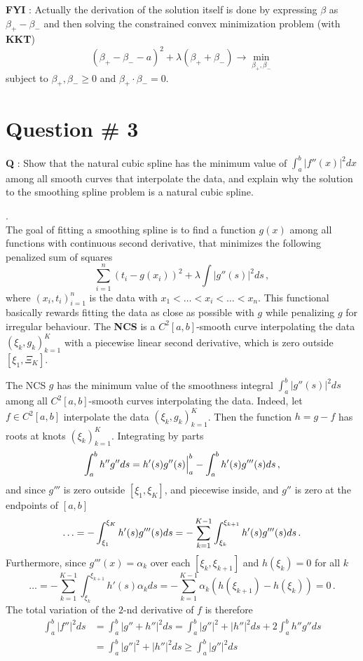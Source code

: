 \documentclass[a4paper]{article}
\begin{document}
\noindent\textbf{FYI} : Actually the derivation of the solution itself is done
by expressing $\beta$ as $\beta_+-\beta_-$ and then solving the constrained convex
minimization problem (with \textbf{KKT})
\[ (\beta_+ - \beta_- - a )^2 + \lambda (\beta_+ + \beta_-) \to \min_{\beta_+,\beta_-}\]
subject to $\beta_+, \beta_-\geq 0$ and $\beta_+ \cdot \beta_-=0$.

\clearpage

\section[NCS]{Question \# 3} %
\label{sec:question_3}
\textbf{\large \textbf{Q}} : Show that the natural cubic spline has the minimum
value of $\int_a^b |f''(x)|^2 dx$ among all smooth curves that interpolate the
data, and explain why the solution to the smoothing spline problem is a natural
cubic spline.

 .\hfill\\
The goal of fitting a smoothing spline is to find a function $g(x)$ among all
functions with continuous second derivative, that minimizes the following penalized
sum of squares
\[ \sum_{i=1}^n (t_i - g(x_i))^2 + \lambda \int |g''(s)|^2 ds \,, \]
where $(x_i,t_i)_{i=1}^n$ is the data with $x_1<\ldots<x_i<\ldots<x_n$.
This functional basically rewards fitting the data as close as possible with $g$
while penalizing $g$ for irregular behaviour. The \textbf{NCS} is a $C^2[a,b]$-smooth
curve interpolating the data $(\xi_k, g_k)_{k=1}^K$ with a piecewise linear second
derivative, which is zero outside $[\xi_1,\Xi_K]$.

The NCS $g$ has the minimum value of the smoothness integral $\int_a^b |g''(s)|^2 ds$
among all $C^2[a,b]$-smooth curves interpolating the data. Indeed, let $f\in C^2[a,b]$
interpolate the data $(\xi_k, g_k)_{k=1}^K$. Then the function $h = g - f$ has roots
at knots $(\xi_k)_{k=1}^K$. Integrating by parts
\[
\int_a^b h'' g'' ds
= \Bigl. h'(s) g''(s)\Bigr\rvert_a^b - \int_a^b h'(s) g'''(s) ds \,,
\]
and since $g'''$ is zero outside $[\xi_1, \xi_K]$, and piecewise inside, and
$g''$ is zero at the endpoints of $[a,b]$
\[
\ldots
= - \int_{\xi_1}^{\xi_K} h'(s) g'''(s) ds \\
= - \sum_{k=1}^{K-1} \int_{\xi_k}^{\xi_{k+1}} h'(s) g'''(s) ds \,.
\]
Furthermore, since $g'''(x) = \alpha_k$ over each $[\xi_k,\xi_{k+1}]$ and $h(\xi_k)=0$
for all $k$
\[
\ldots
= - \sum_{k=1}^{K-1} \int_{\xi_k}^{\xi_{k+1}} h'(s) \alpha_k ds
= - \sum_{k=1}^{K-1} \alpha_k (h(\xi_{k+1})-h(\xi_k)) = 0\,.
\]
The total variation of the $2$-nd derivative of $f$ is therefore
\begin{align*}
	\int_a^b |f''|^2 ds
	&= \int_a^b \bigl|g'' + h''\bigr|^2 ds
	= \int_a^b |g''|^2 + |h''|^2 ds + 2 \int_a^b h'' g'' ds\\
	&= \int_a^b |g''|^2 + |h''|^2 ds \geq \int_a^b |g''|^2 ds
\end{align*}
\end{document}
